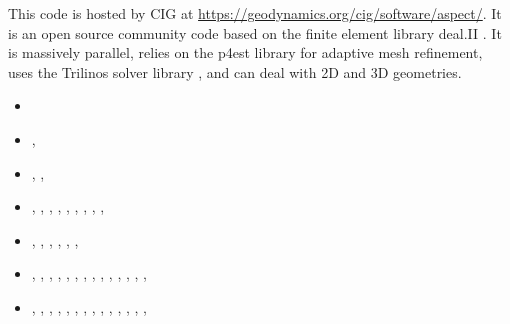 This code is hosted by CIG at \url{https://geodynamics.org/cig/software/aspect/}. 
It is an open source community code based on the finite element library deal.II \cite{bahk07,arbc19,arbd20}. 
It is massively parallel, relies on the p4est library for adaptive mesh refinement,
uses the Trilinos solver library \cite{hewi12}, and can deal with 2D and 3D geometries. 

\begin{small}
\begin{itemize}
\item[2012]      \textcite{krhb12}
\item[2015]     \textcite{aupm15},  \textcite{tosn15}
\item[\twothousandsixteen]     \textcite{dahe16},  \textcite{gadb16}, 
                               \textcite{zhon16}
\item[\twothousandseventeen]   \textcite{hepb17},  \textcite{daef17}, 
                               \textcite{hedg17},  \textcite{robh17}, 
                               \textcite{robu17},  \textcite{aumh17},
                               \textcite{thie17},  \textcite{brsg17}, 
                               \textcite{onmz17},  \textcite{tasm17}
\item[\twothousandeighteen]    \textcite{daga18},  \textcite{onzh18}, 
                               \textcite{gltf18}
                               \textcite{galh18}, 
                               \textcite{peka18},  \textcite{puth18},
                               \textcite{brst18b}, \textcite{zhli18}
\item[\twothousandnineteen]    \textcite{baba19},  \textcite{stbl19}, 
                               \textcite{cocf19},  \textcite{liki19}, 
                               \textcite{galb19},  \textcite{dagg19},
                               \textcite{njas19},  \textcite{sepg19}, 
                               \textcite{ropu19},  \textcite{frtv19},  \textcite{frbt19},
                               \textcite{lixs19},  \textcite{hepm19},  \textcite{heps19}, 
                               \textcite{perr19}
\item[\twothousandtwenty]      \textcite{gadb20},  \textcite{fahm20},  \textcite{onmb20}, 
                               \textcite{logb20},  \textcite{hect20},  \textcite{hect20b}, 
                               \textcite{glbs20},  \textcite{lerm20},  \textcite{onlw20},
                               \textcite{nagb20},  \textcite{cilw20},  \textcite{fiog20},
                               \textcite{hemn20},  \textcite{onlw20},  \textcite{onei20} 

\end{itemize}
\end{small}
